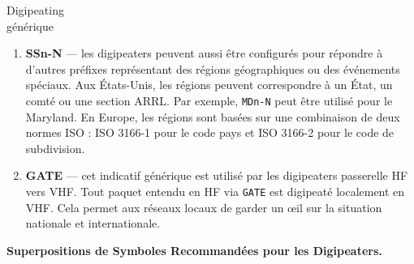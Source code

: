 \begin{aprssideblock}{Digipeating\\générique}
\begin{enumerate}
  Tous les digipeaters conservent une copie de chaque paquet
  retransmis pendant une courte durée, typiquement environ 28
  secondes. Un paquet identique, en ignorant le chemin \emph{via},
  ne sera pas retransmis durant cette période. Pour plus d'efficacité,
  de nombreuses implémentations conservent un checksum plutôt que le
  paquet entier.

  Un digipeater ne doit rien modifier d'autre que le chemin
  \emph{via}. Toute autre modification empêcherait la détection des
  doublons.

\item
  \textbf{SSn-N} --- les digipeaters peuvent aussi être configurés pour
  répondre à d'autres préfixes représentant des régions géographiques ou
  des événements spéciaux. Aux États-Unis, les régions peuvent
  correspondre à un État, un comté ou une section ARRL. Par exemple,
  \texttt{MDn-N} peut être utilisé pour le Maryland. En Europe, les
  régions sont basées sur une combinaison de deux normes ISO :
  ISO 3166-1 pour le code pays et ISO 3166-2 pour le code de
  subdivision.

\item
  \textbf{GATE} --- cet indicatif générique est utilisé par les
  digipeaters passerelle HF vers VHF. Tout paquet entendu en HF via
  \texttt{GATE} est digipeaté localement en VHF. Cela permet aux réseaux
  locaux de garder un œil sur la situation nationale et internationale.
\end{enumerate}

\begin{samepage}
{\sffamily\bfseries Superpositions de Symboles Recommandées pour les Digipeaters.}


\end{samepage}
\end{aprssideblock}
